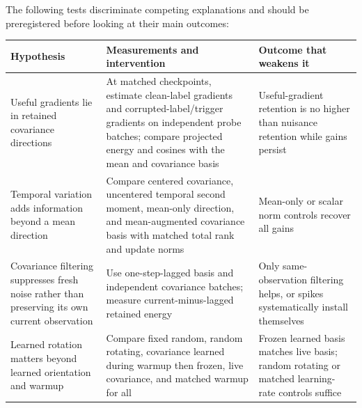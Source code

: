 \documentclass[
  british,
  10pt,
  a4paper,
]{article}
\newcounter{none} %
\begin{document}
The following tests discriminate competing explanations and should be
preregistered before looking at their main outcomes:

{\def\LTcaptype{none} %
\begin{longtable}[]{@{}
  >{\raggedright\arraybackslash}p{}
  >{\raggedright\arraybackslash}p{}
  >{\raggedright\arraybackslash}p{}@{}}
\toprule\noalign{}
\begin{minipage}[b]{\linewidth}\raggedright
Hypothesis
\end{minipage} & \begin{minipage}[b]{\linewidth}\raggedright
Measurements and intervention
\end{minipage} & \begin{minipage}[b]{\linewidth}\raggedright
Outcome that weakens it
\end{minipage} \\
\midrule\noalign{}
\endhead
\bottomrule\noalign{}
\endlastfoot
Useful gradients lie in retained covariance directions & At matched
checkpoints,\allowbreak{} estimate clean-\allowbreak{}label gradients
and corrupted-\allowbreak{}label/\allowbreak{}trigger gradients on
independent probe batches; compare projected energy and cosines with the
mean and covariance basis & Useful-\allowbreak{}gradient retention is no
higher than nuisance retention while gains persist \\
Temporal variation adds information beyond a mean direction & Compare
centered covariance,\allowbreak{} uncentered temporal second moment,
mean-only direction, and mean-\allowbreak{}augmented covariance basis
with matched total rank and update norms & Mean-only or scalar norm
controls recover all gains \\
Covariance filtering suppresses fresh noise rather than preserving its
own current observation & Use one-\allowbreak{}step-\allowbreak{}lagged
basis and independent covariance batches; measure
current-\allowbreak{}minus-\allowbreak{}lagged retained energy & Only
same-\allowbreak{}observation filtering helps, or spikes systematically
install themselves \\
Learned rotation matters beyond learned orientation and warmup & Compare
fixed random, random rotating, covariance learned during warmup then
frozen, live covariance,\allowbreak{} and matched warmup for all &
Frozen learned basis matches live basis; random rotating or matched
learning-\allowbreak{}rate controls suffice \\

\end{longtable}}
\end{document}
